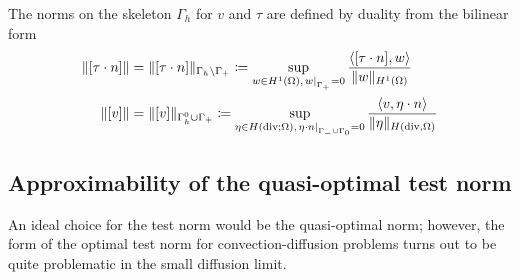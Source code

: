 \documentclass[11pt,onecolumn]{scrartcl}
\begin{document}
The norms on the skeleton $\Gamma_h$ for $v$ and $\tau$ are defined by duality from the bilinear form
\begin{align*}
\|[\tau\cdot n]\| &= \|[\tau\cdot n]\|_{\Gamma_h \setminus \Gamma_+} \coloneqq \sup_{w\in H^1(\Omega), \left.w\right|_{\Gamma_+} = 0} \frac{\langle [\tau \cdot n], w\rangle}{\|w\|_{H^1(\Omega)}}\\
\|[v]\|&=\|[v]\|_{\Gamma_h^0 \cup \Gamma_+} \coloneqq \sup_{\eta\in H({\rm div};\Omega), \left.\eta\cdot n\right|_{\Gamma_- \cup \Gamma_0} = 0} \frac{\langle v, \eta\cdot n\rangle}{\|\eta\|_{H({\rm div},\Omega)}}
\end{align*}

\subsection{Approximability of the quasi-optimal test norm}

An ideal choice for the test norm would be the quasi-optimal norm; however, the form of the optimal test norm for convection-diffusion problems turns out to be quite problematic in the small diffusion limit.  
\end{document}
